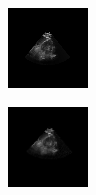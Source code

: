 
\begin{figure}[htb]
        \begin{subfigure}[b]{0.245\textwidth}
                \centering
                \includegraphics[width=\linewidth]{img_seg/30_post}
        \end{subfigure}%
        \hspace{1px}
        \begin{subfigure}[b]{0.245\textwidth}
                \centering
                \includegraphics[width=\linewidth]{img_seg/32_post}

\end{subfigure}
\end{figure}
